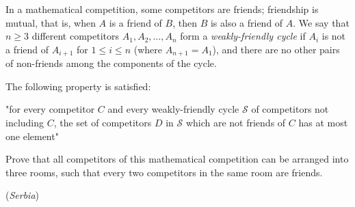 In a mathematical competition, some competitors are friends; friendship is mutual, that is, when $A$ is a friend of $B$, then $B$ is also a friend of $A$.
We say that $n \geq 3$ different competitors $A_1, A_2, \ldots, A_n$ form a \textit{weakly-friendly cycle }if $A_i$ is not a friend of $A_{i+1}$ for $1 \leq i \leq n$ (where $A_{n+1} = A_1$), and there are no other pairs of non-friends among the components of the cycle.

The following property is satisfied:

"for every competitor $C$ and every weakly-friendly cycle $\mathcal{S}$ of competitors not including $C$, the set of competitors $D$ in $\mathcal{S}$ which are not friends of $C$ has at most one element"

Prove that all competitors of this mathematical competition can be arranged into three rooms, such that every two competitors in the same room are friends.

(\textit{Serbia})